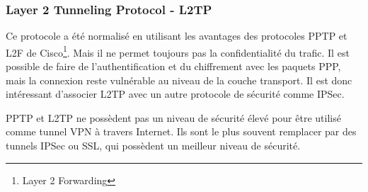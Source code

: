 \subsubsection{Layer 2 Tunneling Protocol - L2TP}
Ce protocole a été normalisé en utilisant les avantages des protocoles PPTP et L2F de Cisco\footnote{Layer 2 Forwarding}. 
Mais il ne permet toujours pas la confidentialité du trafic. 
Il est possible de faire de l'authentification et du chiffrement avec les paquets PPP, mais la connexion reste vulnérable au niveau de la couche transport. 
Il est donc intéressant d'associer L2TP avec un autre protocole de sécurité comme IPSec.

PPTP  et L2TP ne possèdent pas un niveau de sécurité élevé pour être utilisé comme tunnel VPN à travers Internet.
Ils sont le plus souvent remplacer par des tunnels IPSec ou SSL, qui possèdent un meilleur niveau de sécurité.